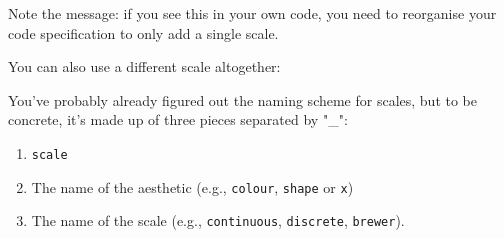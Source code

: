 \begin{Shaded}
\begin{Highlighting}[]
\OperatorTok{+}\StringTok{ }
\StringTok{  }\NormalTok{() }\OperatorTok{+}\StringTok{ }
\StringTok{  }\NormalTok{(}\NormalTok{) }\OperatorTok{+}
\StringTok{  }\NormalTok{(}\NormalTok{)}

\OperatorTok{+}\StringTok{ }
\StringTok{  }\NormalTok{() }\OperatorTok{+}\StringTok{ }
\StringTok{  }\NormalTok{(}\NormalTok{)}
\end{Highlighting}
\end{Shaded}

Note the message: if you see this in your own code, you need to
reorganise your code specification to only add a single scale.

You can also use a different scale altogether:

\begin{Shaded}
\begin{Highlighting}[]
\OperatorTok{+}\StringTok{ }
\StringTok{  }\NormalTok{(}\NormalTok{(}\OperatorTok{+}
\StringTok{  }\NormalTok{() }\OperatorTok{+}\StringTok{ }
\StringTok{  }\NormalTok{()}
\end{Highlighting}
\end{Shaded}

You've probably already figured out the naming scheme for scales, but to
be concrete, it's made up of three pieces separated by "\_":

\begin{enumerate}
\def\labelenumi{\arabic{enumi}.}
\tightlist
\item
  \texttt{scale}
\item
  The name of the aesthetic (e.g., \texttt{colour}, \texttt{shape} or
  \texttt{x})
\item
  The name of the scale (e.g., \texttt{continuous}, \texttt{discrete},
  \texttt{brewer}).
\end{enumerate}

